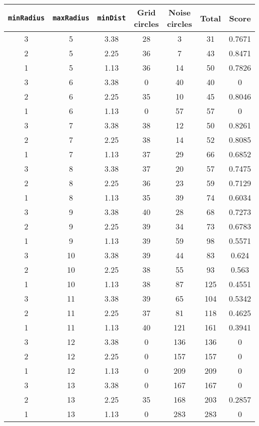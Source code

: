 \documentclass[letterpaper, 12pt]{article}
\begin{document}
\begin{longtable}{|c|c|c|c|c|c|c|}
\hline
\textbf{\texttt{minRadius}} & \textbf{\texttt{maxRadius}} & \textbf{\texttt{minDist}} & \textbf{Grid circles} & \textbf{Noise circles} & \textbf{Total} & \textbf{Score} \\
\hline
3 & 5 & 3.38 & 28 & 3 & 31 & 0.7671 \\
\hline
2 & 5 & 2.25 & 36 & 7 & 43 & 0.8471 \\
\hline
1 & 5 & 1.13 & 36 & 14 & 50 & 0.7826 \\
\hline
3 & 6 & 3.38 & 0 & 40 & 40 & 0 \\
\hline
2 & 6 & 2.25 & 35 & 10 & 45 & 0.8046 \\
\hline
1 & 6 & 1.13 & 0 & 57 & 57 & 0 \\
\hline
3 & 7 & 3.38 & 38 & 12 & 50 & 0.8261 \\
\hline
2 & 7 & 2.25 & 38 & 14 & 52 & 0.8085 \\
\hline
1 & 7 & 1.13 & 37 & 29 & 66 & 0.6852 \\
\hline
3 & 8 & 3.38 & 37 & 20 & 57 & 0.7475 \\
\hline
2 & 8 & 2.25 & 36 & 23 & 59 & 0.7129 \\
\hline
1 & 8 & 1.13 & 35 & 39 & 74 & 0.6034 \\
\hline
3 & 9 & 3.38 & 40 & 28 & 68 & 0.7273 \\
\hline
2 & 9 & 2.25 & 39 & 34 & 73 & 0.6783 \\
\hline
1 & 9 & 1.13 & 39 & 59 & 98 & 0.5571 \\
\hline
3 & 10 & 3.38 & 39 & 44 & 83 & 0.624 \\
\hline
2 & 10 & 2.25 & 38 & 55 & 93 & 0.563 \\
\hline
1 & 10 & 1.13 & 38 & 87 & 125 & 0.4551 \\
\hline
3 & 11 & 3.38 & 39 & 65 & 104 & 0.5342 \\
\hline
2 & 11 & 2.25 & 37 & 81 & 118 & 0.4625 \\
\hline
1 & 11 & 1.13 & 40 & 121 & 161 & 0.3941 \\
\hline
3 & 12 & 3.38 & 0 & 136 & 136 & 0 \\
\hline
2 & 12 & 2.25 & 0 & 157 & 157 & 0 \\
\hline
1 & 12 & 1.13 & 0 & 209 & 209 & 0 \\
\hline
3 & 13 & 3.38 & 0 & 167 & 167 & 0 \\
\hline
2 & 13 & 2.25 & 35 & 168 & 203 & 0.2857 \\
\hline
1 & 13 & 1.13 & 0 & 283 & 283 & 0 \\

\end{longtable}
\end{document}
